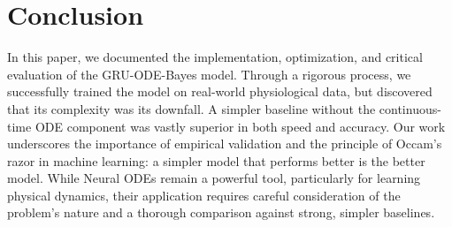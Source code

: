 \section{Conclusion}
\label{sec:conclusion}

In this paper, we documented the implementation, optimization, and critical evaluation of the GRU-ODE-Bayes model. 
Through a rigorous process, we successfully trained the model on real-world physiological data, but discovered that its 
complexity was its downfall. 
A simpler baseline without the continuous-time ODE component was vastly superior in both speed and accuracy. 
Our work underscores the importance of empirical validation and the principle of Occam's razor in machine learning:
a simpler model that performs better is the better model. 
While Neural ODEs remain a powerful tool, particularly for learning physical dynamics, 
their application requires careful consideration of the problem's nature and a thorough 
comparison against strong, simpler baselines.